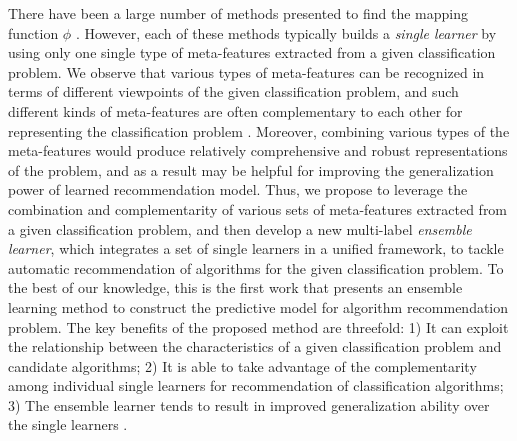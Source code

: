 \documentclass[prodmode,acmtkdd]{acmsmall}
\begin{document}
There have been a large number of methods presented to find the mapping function $\phi$
\cite{peng2002improved,Pfahringer00meta,kalousis2002algorithm,brazdil2003ranking,ali2006learning,prudencio2011selecting,song2012automatic,wang2014generic}.
However, each of these methods typically builds a \textit{single learner} by using only one single type of meta-features extracted from a given classification problem.
We observe that various types of meta-features can be recognized in terms of different viewpoints of the given classification problem,
and such different kinds of meta-features are often complementary to each other for representing the classification problem \cite{brazdil2003ranking,Bensusan1998god,peng2002improved,Pfahringer00meta,Bensusan2000casa,ho2002complexity,song2012automatic}.
Moreover,
combining various types of the meta-features
would produce relatively comprehensive and robust representations of the problem,
and as a result may be helpful for improving the generalization power of learned recommendation model.
Thus,
we propose to leverage the combination and complementarity of various sets of meta-features extracted from a given classification problem,
and then develop a new multi-label \textit{ensemble learner}, which integrates a set of single learners in a unified framework,
to tackle automatic recommendation of algorithms for the given classification problem.
To the best of our knowledge,
this is the first work that presents an ensemble learning method to construct the predictive model for algorithm recommendation problem.
The key benefits of the proposed method are threefold:
1) It can exploit the relationship between the characteristics of a given classification problem and candidate algorithms;
2) It is able to take advantage of the complementarity among individual single learners for recommendation of classification algorithms;
3) The ensemble learner tends to result in improved generalization ability over the single learners
\cite{dietterich1997machine,dietterichl2002ensemble}.


\end{document}
